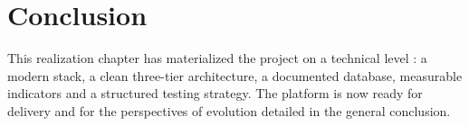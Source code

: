 \section{Conclusion}

This realization chapter has materialized the project on a technical level : a modern stack, a clean three-tier architecture, a documented database, measurable indicators and a structured testing strategy. The platform is now ready for delivery and for the perspectives of evolution detailed in the general conclusion.
